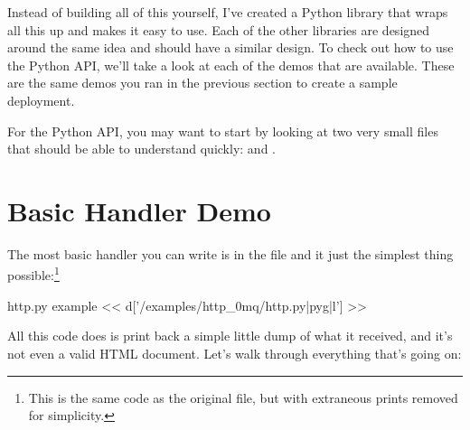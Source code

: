 Instead of building all of this yourself, I've created a Python library
that wraps all this up and makes it easy to use.  Each of the other
libraries are designed around the same idea and should have a similar
design.  To check out how to use the Python API, we'll take a look at
each of the demos that are available.  These are the same demos you
ran in the previous section to create a sample deployment.

For the Python API, you may want to start by looking at two very small files that should be able to understand quickly:
 and
.


\section{Basic Handler Demo}

The most basic handler you can write is in the  file
and it just the simplest thing possible:\footnote{This is the same code as the original
file, but with extraneous prints removed for simplicity.}

\begin{code}{http.py example}
 << d['/examples/http_0mq/http.py|pyg|l'] >>
\end{code}

All this code does is print back a simple little dump of what it received, and
it's not even a valid HTML document.  Let's walk through everything that's going on:

